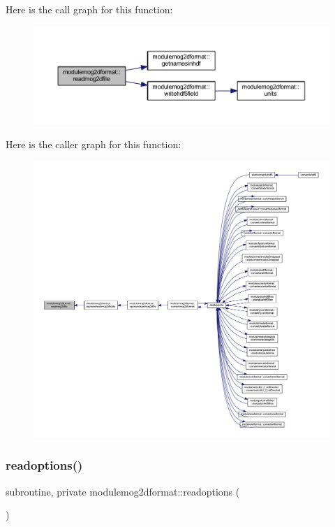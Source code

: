 Here is the call graph for this function\+:\nopagebreak
\begin{figure}[H]
\begin{center}
\leavevmode
\includegraphics[width=350pt]{namespacemodulemog2dformat_a49448dbf7a75da20faf8c9e64364c199_cgraph}
\end{center}
\end{figure}
Here is the caller graph for this function\+:\nopagebreak
\begin{figure}[H]
\begin{center}
\leavevmode
\includegraphics[width=350pt]{namespacemodulemog2dformat_a49448dbf7a75da20faf8c9e64364c199_icgraph}
\end{center}
\end{figure}
\mbox{\label{namespacemodulemog2dformat_a205a84f8a26a7043d7b186a44a8a530a}} 
\subsubsection{\texorpdfstring{readoptions()}{readoptions()}}
{\footnotesize\ttfamily subroutine, private modulemog2dformat\+::readoptions (\begin{DoxyParamCaption}{ }\end{DoxyParamCaption})\hspace{0.3cm}{\ttfamily [private]}}

